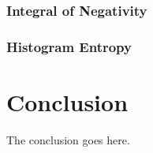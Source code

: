 \documentclass[10pt,journal,compsoc]{IEEEtran}
\begin{document}
\subsubsection{Integral of Negativity}

\subsubsection{Histogram Entropy}

\section{Conclusion}
The conclusion goes here.






%


\appendices
\section{}


\end{document}
